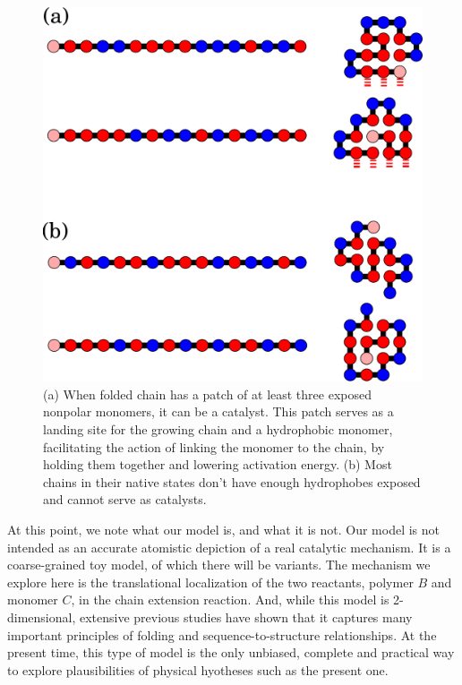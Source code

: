\documentclass[journal=jacsat,manuscript=article,layout=twocolumn]{achemso}
\begin{document}
\begin{figure}[htb!]
  \centering
  \includegraphics[width=\columnwidth]{pictures/fold-cat.pdf} 
  \caption{\footnotesize{(a) 
When folded chain has a patch of at least three exposed nonpolar monomers, it can be a catalyst. 
This patch serves as a landing site for the growing chain and a hydrophobic monomer, facilitating 
the action of linking the monomer to the chain, by holding them together and lowering activation 
energy.} (b) Most chains in their native states don't have enough hydrophobes exposed and cannot 
serve as catalysts.}
  \label{fig:fold-cat}
\end{figure}

 At this point, we note what our model is, and what it is not.  Our model is not intended as an 
 accurate atomistic depiction of a real catalytic mechanism.  It is a coarse-grained toy model, of 
which there will be variants.  The mechanism we explore here is the translational localization of 
the two reactants, polymer $B$ and monomer $C$, in the chain extension reaction.  And, while this 
model is 2-dimensional, extensive previous studies have shown that it captures many important 
principles of folding and sequence-to-structure relationships.  At the present time, this type of 
model is the only unbiased, complete and practical way to explore plausibilities of physical 
hyotheses such as the present one.
\end{document}
